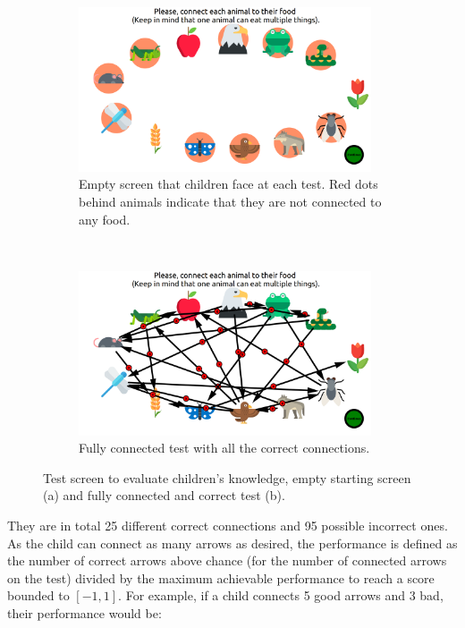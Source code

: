 \begin{figure}[ht]
	\centering
	\begin{subfigure}[t]{0.5\textwidth}
		\centering
		\includegraphics[width=0.95\textwidth]{empty_graph.png}
		\captionsetup{width=.95\linewidth}
		\caption{Empty screen that children face at each test. Red dots behind animals indicate that they are not connected to any food.}
	\end{subfigure}%
	~ 
	\begin{subfigure}[t]{0.5\textwidth}
		\centering
		\includegraphics[width=0.95\textwidth]{full_graph.png}
		\captionsetup{width=.95\linewidth}
		\caption{Fully connected test with all the correct connections.}
	\end{subfigure}
	\caption{Test screen to evaluate children's knowledge, empty starting screen (a) and fully connected and correct test (b).}
	\label{fig:test}
\end{figure}

They are in total 25 different correct connections and 95 possible incorrect ones. As the child can connect as many arrows as desired, the performance is defined as the number of correct arrows above chance (for the number of connected arrows on the test) divided by the maximum achievable performance to reach a score bounded to $[-1,1]$. For example, if a child connects 5 good arrows and 3 bad, their performance would be:

